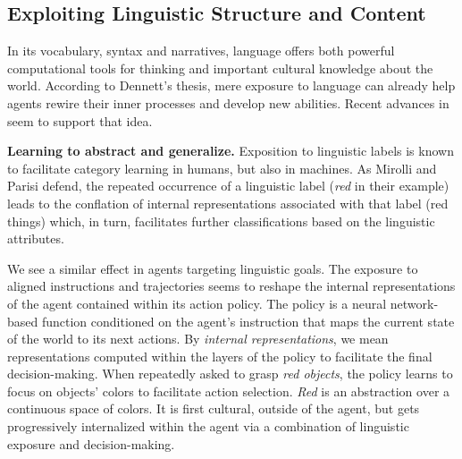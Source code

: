 \subsection{Exploiting Linguistic Structure and Content}
\label{sec:extraction}

In its vocabulary, syntax and narratives, language offers both powerful computational tools for thinking and important cultural knowledge about the world. According to Dennett's thesis, mere exposure to language can already help agents rewire their inner processes and develop new abilities. Recent advances in \ai seem to support that idea.

\textbf{Learning to abstract and generalize.} Exposition to linguistic labels is known to facilitate category learning in humans,\cite{waxman_words_1995, yoshida_sound_2003} but also in machines.\cite{lupyan_carving_2005} As Mirolli and Parisi defend, the repeated occurrence of a linguistic label (\textit{red} in their example) leads to the conflation of internal representations associated with that label (red things) which, in turn, facilitates further classifications based on the linguistic attributes.\cite{mirolli_towards_2011}

We see a similar effect in \rl agents targeting linguistic goals. The exposure to aligned instructions and trajectories seems to reshape the internal representations of the agent contained within its action policy. The policy is a neural network-based function conditioned on the agent's instruction that maps the current state of the world to its next actions. By \textit{internal representations}, we mean representations computed within the layers of the policy to facilitate the final decision-making. When repeatedly asked to grasp \textit{red objects}, the policy learns to focus on objects' colors to facilitate action selection.\cite{hill_emergent_2019,colas_language_2020} \textit{Red} is an abstraction over a continuous space of colors. It is first cultural, outside of the agent, but gets progressively internalized within the agent via a combination of linguistic exposure and decision-making. 

